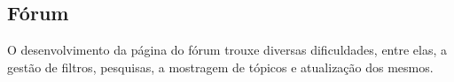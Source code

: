 \subsection{Fórum}
O desenvolvimento da página do fórum trouxe diversas dificuldades, entre elas, a gestão de filtros, pesquisas, a mostragem de tópicos e atualização dos mesmos.

\vspace{10mm}
\begin{figure}[htb]%
 \centering
 \qquad
 \label{fig:72}%
\end{figure}

